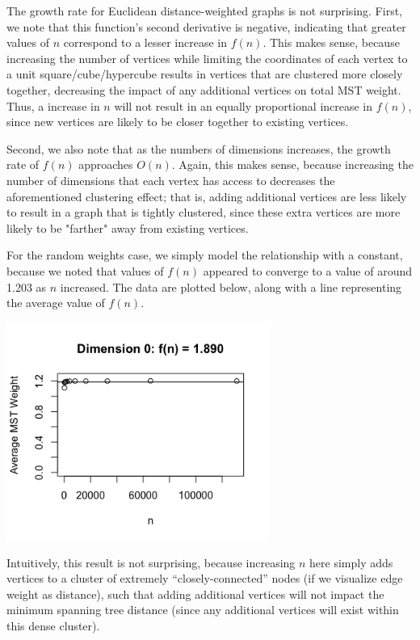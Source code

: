 \documentclass[a4paper]{article}
\begin{document}
The growth rate for Euclidean distance-weighted graphs is not surprising. First, we note that this function's second derivative is negative, indicating that greater values of $n$ correspond to a lesser increase in $f(n)$. This makes sense, because increasing the number of vertices while limiting the coordinates of each vertex to a unit square/cube/hypercube results in vertices that are clustered more closely together, decreasing the impact of any additional vertices on total MST weight. Thus, a increase in $n$ will not result in an equally proportional increase in $f(n)$, since new vertices are likely to be closer together to existing vertices.

Second, we also note that as the numbers of dimensions increases, the growth rate of $f(n)$ approaches $O(n)$. Again, this makes sense, because increasing the number of dimensions that each vertex has access to decreases the aforementioned clustering effect; that is, adding additional vertices are less likely to result in a graph that is tightly clustered, since these extra vertices are more likely to be "farther" away from existing vertices.

For the random weights case, we simply model the relationship with a constant, because we noted that values of $f(n)$ appeared to converge to a value of around 1.203 as $n$ increased. The data are plotted below, along with a line representing the average value of $f(n)$.

\begin{center}
	\includegraphics[width=3.4in]{dim0plot}
\end{center}

Intuitively, this result is not surprising, because increasing $n$ here simply adds vertices to a cluster of extremely ``closely-connected'' nodes (if we visualize edge weight as distance), such that adding additional vertices will not impact the minimum spanning tree distance (since any additional vertices will exist within this dense cluster).
\end{document}
